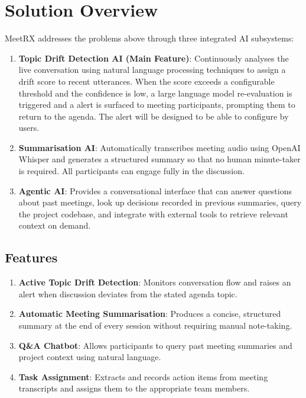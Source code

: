 \section{Solution Overview}
\label{section:solution-overview}

MeetRX addresses the problems above through three integrated AI subsystems:

\begin{enumerate}
    \item \textbf{Topic Drift Detection AI (Main Feature)}: Continuously analyses the live conversation
          using natural language processing techniques to assign a drift score to recent utterances. When the
          score exceeds a configurable threshold and the confidence is low, a large language model re-evaluation is triggered and a
          alert is surfaced to meeting participants, prompting them to return to the agenda. The alert will be designed to be able to configure by users.

    \item \textbf{Summarisation AI}: Automatically transcribes meeting audio using OpenAI Whisper
          and generates a structured summary so that no human minute-taker is required. All participants can
          engage fully in the discussion.

    \item \textbf{Agentic AI}: Provides a conversational interface that can answer questions about past
          meetings, look up decisions recorded in previous summaries, query the project codebase, and integrate
          with external tools to retrieve relevant context on demand.
\end{enumerate}

\subsection{Features}
\label{subsection:features}

\begin{enumerate}[leftmargin=80pt]
    \item \textbf{Active Topic Drift Detection}: Monitors conversation flow and raises an alert when
          discussion deviates from the stated agenda topic.
    \item \textbf{Automatic Meeting Summarisation}: Produces a concise, structured summary at the end of
          every session without requiring manual note-taking.
    \item \textbf{Q\&A Chatbot}: Allows participants to query past meeting summaries and project context
          using natural language.
    \item \textbf{Task Assignment}: Extracts and records action items from meeting transcripts and assigns
          them to the appropriate team members.
\end{enumerate}

